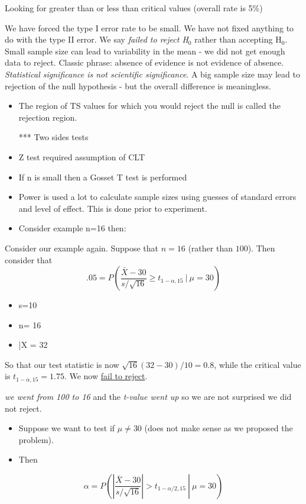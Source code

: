 \documentclass[11pt]{article}
\begin{document}
Looking for greater than or less than critical values (overall rate
is 5\%)

We have forced the type I error rate to be small. We have not fixed
anything to do with the type II error. We say \emph{failed to reject H$_0$}
rather than accepting H$_0$. Small sample size can lead to variability
in the mean - we did not get enough data to reject. Classic phrase:
absence of evidence is not evidence of absence. \emph{Statistical significance is not scientific significance}. A big sample size may
lead to rejection of the null hypothesis - but the overall difference
is meaningless.
\begin{itemize}
\item The region of TS values for which you would reject the null is
  called the rejection region.

 *** Two sides tests
\item Z test required assumption of CLT
\item If n is small then a Gosset T test is performed
\item Power is used a lot to calculate sample sizes using guesses of
  standard errors and level of effect. This is done prior to
  experiment.
\item Consider example n=16 then:
\end{itemize}

Consider our example again. Suppose that $n= 16$ (rather than
$100$). Then consider that 
$$
.05 = P\left(\frac{\bar X - 30}{s / \sqrt{16}} \geq t_{1-\alpha, 15} ~|~ \mu = 30 \right)
$$
\begin{itemize}
\item s=10
\item n= 16
\item \bar{X} = 32
\end{itemize}
So that our test statistic is now $\sqrt{16}(32 - 30) / 10 = 0.8$, while the critical
value is $t_{1-\alpha, 15} = 1.75$. We now \underline{fail to reject}.

\emph{we went from 100 to 16} and the \emph{t-value went up} so we are not
surprised we did not reject.

\begin{itemize}
\item Suppose we want to test if $\mu \ne 30$ (does not make sense as we
  proposed the problem).
\item Then
\end{itemize}

$$\alpha = P\left(\left. \left|\frac{\bar X - 30}{s /\sqrt{16}}\right|
> t_{1-\alpha/2,15} ~\right|~ \mu = 30\right)$$
\end{document}
